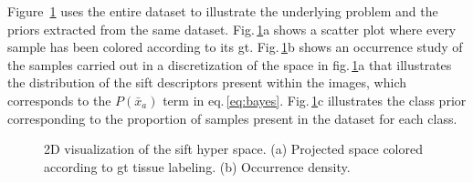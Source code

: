 \documentclass[a4paper, 10pt, conference]{llncs}      %
\begin{document}
Figure~\ref{fig:siftMapping} uses the entire dataset to illustrate the underlying problem and the priors extracted from the same dataset. Fig.\,\ref{fig:siftMapping}a shows a scatter plot where every sample has been colored according to its \ac{gt}. Fig.\,\ref{fig:siftMapping}b shows an occurrence study of the samples carried out in a discretization of the space in fig.\,\ref{fig:siftMapping}a that illustrates the distribution of the \ac{sift} descriptors present within the images, which corresponds to the $P(\bar{x}_a)$ term in eq.\,\ref{eq:bayes}. Fig.\,\ref{fig:siftMapping}c illustrates the class prior corresponding to the proportion of samples present in the dataset for each class.

\begin{figure}[Htbp]
\centering
\quad
{}

\caption{2D visualization of the \acs{sift} hyper space. (a) Projected space colored according to \acs{gt} tissue labeling. (b) Occurrence density.}
\label{fig:siftMapping}
\end{figure}
\end{document}
